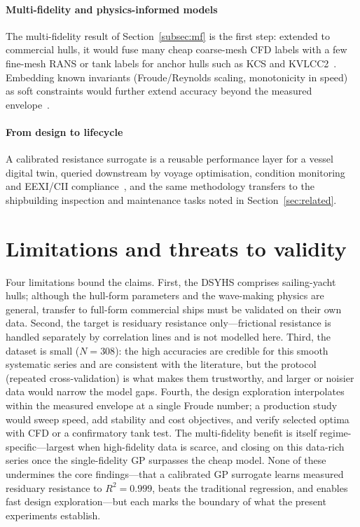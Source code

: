 \documentclass[pdflatex,sn-mathphys-num]{sn-jnl}%
\theoremstyle{thmstyleone}%
\theoremstyle{thmstyletwo}%
\theoremstyle{thmstylethree}%
\begin{document}
\paragraph{Multi-fidelity and physics-informed models}
The multi-fidelity result of Section~\ref{subsec:mf} is the first step: extended
to commercial hulls, it would fuse many cheap coarse-mesh CFD labels with a few
fine-mesh RANS or tank labels for anchor hulls such as KCS and
KVLCC2~\cite{tokyo2015,legratiet2014}. Embedding known invariants
(Froude/Reynolds scaling, monotonicity in speed) as soft constraints would
further extend accuracy beyond the measured envelope~\cite{raissi2019}.

\paragraph{From design to lifecycle}
A calibrated resistance surrogate is a reusable performance layer for a vessel
digital twin, queried downstream by voyage optimisation, condition monitoring and
EEXI/CII compliance~\cite{major2021}, and the same methodology transfers to the
shipbuilding inspection and maintenance tasks noted in
Section~\ref{sec:related}.

\section{Limitations and threats to validity}\label{sec:limits}

Four limitations bound the claims. First, the DSYHS comprises sailing-yacht
hulls; although the hull-form parameters and the wave-making physics are general,
transfer to full-form commercial ships must be validated on their own data.
Second, the target is residuary resistance only---frictional resistance is
handled separately by correlation lines and is not modelled here. Third, the
dataset is small ($N=308$): the high accuracies are credible for this smooth
systematic series and are consistent with the literature, but the protocol
(repeated cross-validation) is what makes them trustworthy, and larger or noisier
data would narrow the model gaps. Fourth, the design exploration interpolates
within the measured envelope at a single Froude number; a production study would
sweep speed, add stability and cost objectives, and verify selected optima with
CFD or a confirmatory tank test. The multi-fidelity benefit is itself
regime-specific---largest when high-fidelity data is scarce, and closing on this
data-rich series once the single-fidelity GP surpasses the cheap model. None of
these undermines the core findings---that
a calibrated GP surrogate learns measured residuary resistance to $R^{2}=0.999$,
beats the traditional regression, and enables fast design exploration---but each
marks the boundary of what the present experiments establish.
\end{document}

